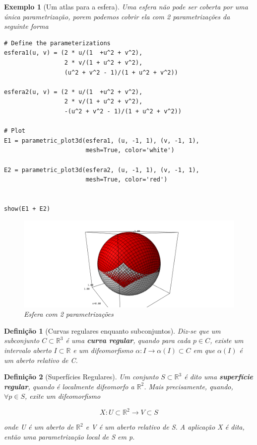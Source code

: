 \documentclass[12pt]{article}
\newtheorem{ex}{Exemplo}[section]
\newtheorem{definition}{Definição}
\begin{document}
\begin{ex}[Um atlas para a esfera]
Uma esfera não pode ser coberta por uma única parametrização, porem podemos cobrir ela com 2 parametrizações da seguinte forma

\begin{lstlisting}
# Define the parameterizations
esfera1(u, v) = (2 * u/(1  +u^2 + v^2), 
                 2 * v/(1 + u^2 + v^2), 
                 (u^2 + v^2 - 1)/(1 + u^2 + v^2))

esfera2(u, v) = (2 * u/(1  +u^2 + v^2), 
                 2 * v/(1 + u^2 + v^2), 
                 -(u^2 + v^2 - 1)/(1 + u^2 + v^2))

# Plot
E1 = parametric_plot3d(esfera1, (u, -1, 1), (v, -1, 1), 
                       mesh=True, color='white')

E2 = parametric_plot3d(esfera2, (u, -1, 1), (v, -1, 1), 
                       mesh=True, color='red')


show(E1 + E2)
\end{lstlisting}

\begin{figure}[H]
    \centering
    \includegraphics[scale=.5]{Images/ex1-2.png}
    \caption{Esfera com 2 parametrizações}
    \label{fig:ex1-2}
\end{figure}
\end{ex}

\begin{definition}[Curvas regulares enquanto subconjuntos]
Diz-se que um subconjunto $C \subset \mathbb{R}^3$ é uma \textbf{curva regular}, quando para cada $p \in C$, existe um intervalo aberto $I \subset \mathbb{R}$ e um difeomorfismo $\alpha: I \rightarrow \alpha(I) \subset C$ em que $\alpha(I)$ é um aberto relativo de C.
\end{definition}

\begin{definition}[Superfícies Regulares]
Um conjunto $S \subset \mathbb{R}^3$ é dito uma \textbf{superfície regular}, quando é localmente difeomorfo a $\mathbb{R}^2$. Mais precisamente, quando, $\forall p \in S$, exite um difeomorfismo

$$X: U \subset \mathbb{R}^2 \rightarrow V \subset S$$

onde U é um aberto de $\mathbb{R}^2$ e V é um aberto relativo de S. A aplicação X é dita, então uma parametrização local de S em p.
\end{definition}
\end{document}
